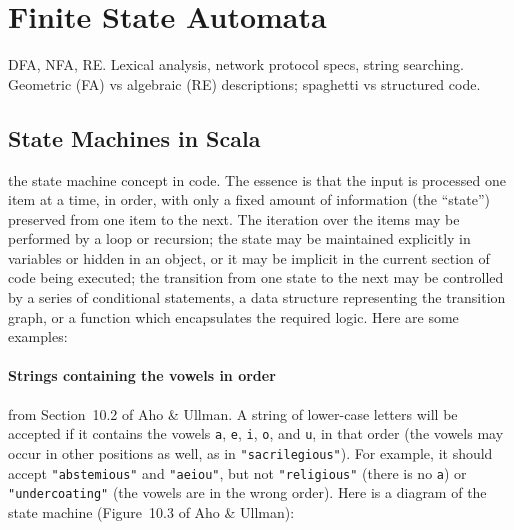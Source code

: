 
\section{Finite State Automata}
DFA, NFA, RE. Lexical analysis, network protocol specs, string searching. Geometric (FA) vs algebraic (RE) descriptions; spaghetti vs structured code.
\label{sec:moore}

\subsection{State Machines in Scala}
 the state machine concept in code. The essence is that
the input is processed one item at a time, in order, with only a fixed amount of
information (the ``state'') preserved from one item to the next. The iteration over the
items may be performed by a loop or recursion; the state may be maintained explicitly
in variables or hidden in an object, or it may be implicit in the current section of
code being executed; the transition from one state to the next may be controlled by a
series of conditional statements, a data structure representing the transition graph,
or a function which encapsulates the required logic. Here are some examples:

\paragraph{Strings containing the vowels in order}

 from Section~10.2 of Aho \& Ullman. A string of lower-case letters
will be accepted if it contains the vowels \verb|a|, \verb|e|, \verb|i|, \verb|o|, and \verb|u|, in that order
(the vowels may occur in other positions as well, as in \verb|"sacrilegious"|). For example, it should accept \verb|"abstemious"| and \verb|"aeiou"|, but not \verb|"religious"| (there is no \verb|a|) or \verb|"undercoating"| (the vowels are in the wrong order). Here is a diagram of the state machine (Figure~10.3 of Aho \& Ullman):
\begin{center}
\end{center}

